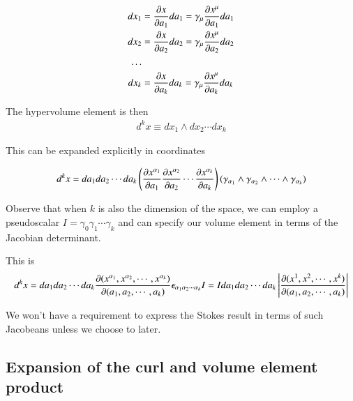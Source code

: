 \begin{align*}
dx_1 & = \PD{a_1}{x} da_1 = \gamma_\mu \PD{a_1}{x^\mu} da_1 \\
dx_2 & = \PD{a_2}{x} da_2 = \gamma_\mu \PD{a_2}{x^\mu} da_2 \\
\hdots \\
dx_k & = \PD{a_k}{x} da_k = \gamma_\mu \PD{a_k}{x^\mu} da_k \\
\end{align*}

The hypervolume element is then
\begin{align}
d^k x \equiv dx_1 \wedge dx_2 \cdots dx_k
\end{align}

This can be expanded explicitly in coordinates

\begin{align*}
d^k x 
&= da_1 da_2 \cdots da_k 
\left(
\PD{a_1}{x^{\alpha_1}} 
\PD{a_2}{x^{\alpha_2}} 
\cdots
\PD{a_k}{x^{\alpha_k}} 
\right)
( \gamma_{\alpha_1} \wedge \gamma_{\alpha_2} \wedge \cdots \wedge \gamma_{\alpha_k} ) \\
\end{align*}

Observe that when $k$ is also the dimension of the space, we can employ a pseudoscalar $I = \gamma_0 \gamma_1 \cdots \gamma_k$ and can specify our volume element in terms of the Jacobian determinant.

This is
\begin{align}\label{eqn:stokesNoTensor:jacobian}
d^k x =
da_1 da_2 \cdots da_k
\PD{(a_1, a_2, \cdots, a_k)}{(x^{\alpha_1}, x^{\alpha_2}, \cdots, x^{\alpha_k})}
\epsilon_{ \alpha_1 \alpha_2 \cdots \alpha_k } I
= 
I da_1 da_2 \cdots da_k \Abs{
\PD{(a_1, a_2, \cdots, a_k)}{(x^1, x^2, \cdots, x^k)}
}
\end{align}

We won't have a requirement to express the Stokes result in terms of such Jacobeans unless we choose to later.

\subsection{Expansion of the curl and volume element product}

